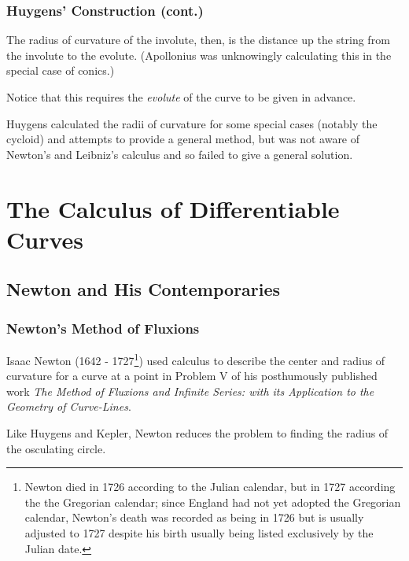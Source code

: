 \documentclass{beamer}
\theoremstyle{definition}
\begin{document}
\begin{frame}
    \frametitle{Huygens' Construction (cont.)}

    The radius of curvature of the involute, then, is the distance up the string from
    the involute to the evolute. (Apollonius was unknowingly calculating this in the
    special case of conics.)

    Notice that this requires the \emph{evolute} of the curve to be given in advance.

    Huygens calculated the radii of curvature for some special cases (notably the cycloid)
    and attempts to provide a general method, but was not aware of Newton's and Leibniz's
    calculus and so failed to give a general solution. \cite{unsat-hist}
\end{frame}

\section{The Calculus of Differentiable Curves}

\subsection{Newton and His Contemporaries}

\begin{frame}
    \frametitle{Newton's Method of Fluxions}

    Isaac Newton (1642 - 1727\footnote{Newton died in 1726 according to the Julian calendar,
    but in 1727 according the the Gregorian calendar; since England had not yet adopted the
    Gregorian calendar, Newton's death was recorded as being in 1726 but is usually adjusted
    to 1727 despite his birth usually being listed exclusively by the Julian date.})
    used calculus to describe the center and radius of curvature for a curve at a point
    in Problem V of his posthumously published work \textit{The Method of Fluxions and Infinite
    Series: with its Application to the Geometry of Curve-Lines}. \cite{newton}

    Like Huygens and Kepler, Newton reduces the problem to finding the radius of the osculating
    circle.

\end{frame}
\end{document}
